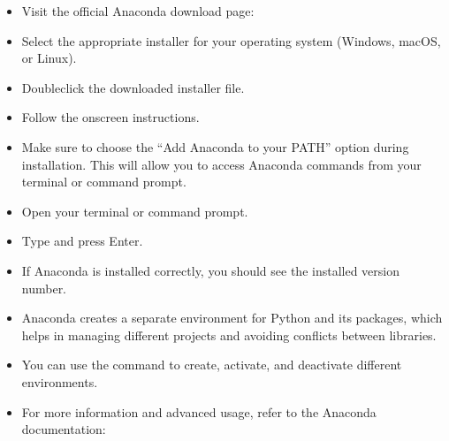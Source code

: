 \documentclass[letterpaper,10pt,english]{jupyterBook}
\begin{document}
\sphinxAtStartPar
{}
\begin{itemize}
\item {} 
\sphinxAtStartPar
Visit the official Anaconda download page: 

\item {} 
\sphinxAtStartPar
Select the appropriate installer for your operating system (Windows, macOS, or Linux).

\end{itemize}

\sphinxAtStartPar
{}
\begin{itemize}
\item {} 
\sphinxAtStartPar
Double\sphinxhyphen{}click the downloaded installer file.

\item {} 
\sphinxAtStartPar
Follow the on\sphinxhyphen{}screen instructions.

\item {} 
\sphinxAtStartPar
Make sure to choose the “Add Anaconda to your PATH” option during installation. This will allow you to access Anaconda commands from your terminal or command prompt.

\end{itemize}

\sphinxAtStartPar
{}
\begin{itemize}
\item {} 
\sphinxAtStartPar
Open your terminal or command prompt.

\item {} 
\sphinxAtStartPar
Type  and press Enter.

\item {} 
\sphinxAtStartPar
If Anaconda is installed correctly, you should see the installed version number.

\end{itemize}

\sphinxAtStartPar
{}
\begin{itemize}
\item {} 
\sphinxAtStartPar
Anaconda creates a separate environment for Python and its packages, which helps in managing different projects and avoiding conflicts between libraries.

\item {} 
\sphinxAtStartPar
You can use the  command to create, activate, and deactivate different environments.

\item {} 
\sphinxAtStartPar
For more information and advanced usage, refer to the Anaconda documentation: 

\end{itemize}
\end{document}
